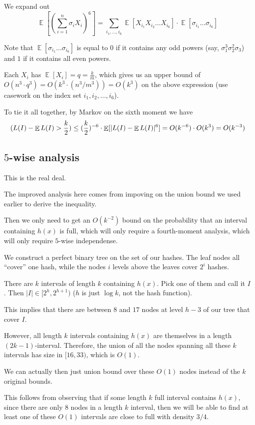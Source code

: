\documentclass[11pt]{article}
\DeclareMathOperator*{\E}{\mathbb{E}}
\let\Pr\relax
\DeclareMathOperator*{\Pr}{\mathbb{P}}
\begin{document}
We expand out
$$\E[(\sum_{i=1}^n \sigma_i X_i)^6] = \sum_{i_1, \dots, i_6} \E[X_{i_1}X_{i_2}\dots X_{i_6}] \cdot \E[\sigma_{i_1}\dots\sigma_{i_6}]$$

Note that $\E[\sigma_{i_1}\dots\sigma_{i_6}]$ is equal to $0$ if it contains any odd powers (say, $\sigma_1^3\sigma_2^2\sigma_3$) and $1$ if it contains all even powers. 

Each $X_i$ has $\E[X_i] = q = \frac{k}{m}$, which gives us an upper bound of $O(n^3 \cdot q^3) = O(k^3 \cdot (n^3/m^3)) = O(k^3)$ on the above expression (use casework on the index set $i_1, i_2, \dots, i_6$). 

To tie it all together, by Markov on the sixth moment we have 
$$\Pr(L(I) - \E L(I) > \frac{k}{2}) \leq (\frac{k}{2})^{-6} \cdot \E[|L(I) - \E L(I)|^6] = O(k^{-6}) \cdot O(k^3) = O(k^{-3})$$

\subsection{$5$-wise analysis}

This is the real deal. 

The improved analysis here comes from impoving on the union bound we used earlier to derive the inequality. 

Then we only need to get an $O(k^{-2})$ bound on the probability that an interval containing $h(x)$ is full, which will only require a fourth-moment analysis, which will only require $5$-wise independense. 

We construct a perfect binary tree on the set of our hashes. The leaf nodes all ``cover'' one hash, while the nodes $i$ levels above the leaves cover $2^i$ hashes.  

There are $k$ intervals of length $k$ containing $h(x)$. Pick one of them and call it $I$. Then $|I| \in [2^h, 2^{h+1})$ ($h$ is just $\log k$, not the hash function). 

This implies that there are between $8$ and $17$ nodes at level $h-3$ of our tree that cover $I$. 

However, all length $k$ intervals containing $h(x)$ are themselves in a length $(2k-1)$-interval. Therefore, the union of all the nodes spanning all these $k$ intervals has size in $[16, 33)$, which is $O(1)$.  

We can actually then just union bound over these $O(1)$ nodes instead of the $k$ original bounds. 

This follows from observing that if some length $k$ full interval contains $h(x)$, since there are only 8 nodes in a length $k$ interval, then we will be able to find at least one of these $O(1)$ intervals are close to full with density $3/4$. 
\end{document}
